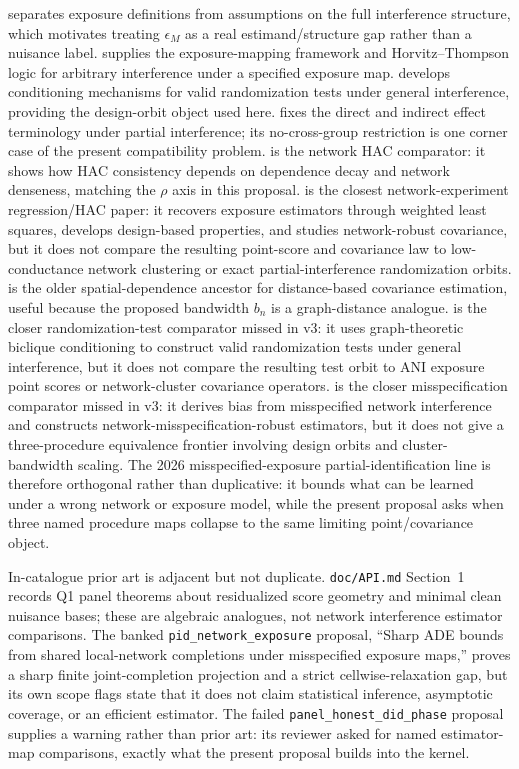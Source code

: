 \documentclass[11pt]{article}
\theoremstyle{definition}
\theoremstyle{plain}
\theoremstyle{remark}
\begin{document}
\citet{Savje2024MisspecifiedExposure} separates exposure definitions from
assumptions on the full interference structure, which motivates treating
\(\epsilon_M\) as a real estimand/structure gap rather than a nuisance label.
\citet{AronowSamii2017Exposure} supplies the exposure-mapping framework and
Horvitz--Thompson logic for arbitrary interference under a specified exposure
map.  \citet{BasseFellerToulis2019} develops conditioning mechanisms for
valid randomization tests under general interference, providing the
design-orbit object used here.  \citet{HudgensHalloran2008} fixes the direct
and indirect effect terminology under partial interference; its no-cross-group
restriction is one corner case of the present compatibility problem.
\citet{KojevnikovMarmerSong2021} is the network HAC comparator: it shows how
HAC consistency depends on dependence decay and network denseness, matching
the \(\rho\) axis in this proposal.  \citet{GaoDing2025Network} is the
closest network-experiment regression/HAC paper: it recovers exposure
estimators through weighted least squares, develops design-based properties,
and studies network-robust covariance, but it does not compare the resulting
point-score and covariance law to low-conductance network clustering or exact
partial-interference randomization orbits.  \citet{Conley1999Spatial} is the older
spatial-dependence ancestor for distance-based covariance estimation, useful
because the proposed bandwidth \(b_n\) is a graph-distance analogue.
\citet{PuelzBasseFellerToulis2022} is the closer randomization-test comparator
missed in v3: it uses graph-theoretic biclique conditioning to construct valid
randomization tests under general interference, but it does not compare the
resulting test orbit to ANI exposure point scores or network-cluster covariance
operators.  \citet{WeinsteinNevo2026} is the closer misspecification comparator
missed in v3: it derives bias from misspecified network interference and
constructs network-misspecification-robust estimators, but it does not give a
three-procedure equivalence frontier involving design orbits and
cluster-bandwidth scaling.  The 2026 misspecified-exposure
partial-identification line is therefore orthogonal rather than duplicative:
it bounds what can be learned under a wrong network or exposure model, while
the present proposal asks when three named procedure maps collapse to the same
limiting point/covariance object.

In-catalogue prior art is adjacent but not duplicate.  \texttt{doc/API.md}
Section~1 records Q1 panel theorems about residualized score geometry and
minimal clean nuisance bases; these are algebraic analogues, not network
interference estimator comparisons.  The banked \texttt{pid\_network\_exposure}
proposal, ``Sharp ADE bounds from shared local-network completions under
misspecified exposure maps,'' proves a sharp finite joint-completion projection
and a strict cellwise-relaxation gap, but its own scope flags state that it does
not claim statistical inference, asymptotic coverage, or an efficient
estimator.  The failed \texttt{panel\_honest\_did\_phase} proposal supplies a
warning rather than prior art: its reviewer asked for named estimator-map
comparisons, exactly what the present proposal builds into the kernel.
\end{document}
